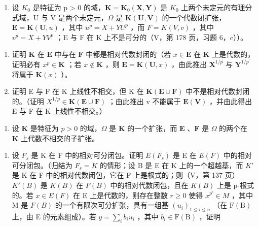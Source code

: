 \BourbakiExerciseGroup

\begin{enumerate}
\def\labelenumi{\arabic{enumi})}
\tightlist
\item
  设 \(K_{0}\) 是特征为 p \textgreater{} 0 的域，\(\mathbf{K} = \mathbf{K}_{0}(\mathbf{X}, \mathbf{Y})\) 是 \(K_{0}\) 上两个未定元的有理分式域，U 与 V 是两个未定元，\(\Omega\) 是 \(\mathbf{K}(\mathbf{U}, \mathbf{V})\) 的一个代数闭扩张，\(\mathbf{E} = \mathbf{K}(\mathbf{U}, u)\) ，其中 \(u^{p} = X + YU^{p}\) ，而 \(F = K(V, v)\) ，其中 \(v^{p} = X + YV^{p}\) ；E 与 F 在 K 上不是可分的（V，第 178 页，习题 6，c））。
\end{enumerate}

\begin{enumerate}
\def\labelenumi{\alph{enumi})}
\item
  证明 \(\mathbf{K}\) 在 \(\mathbf{E}\) 中与在 \(\mathbf{F}\) 中都是相对代数封闭的（若 \(x \in \mathbf{E}\) 在 \(\mathbf{K}\) 上是代数的，证明必有 \(x^p \in \mathbf{K}\) ；若 \(x \notin \mathbf{K}\) ，则 \(\mathbf{E} = \mathbf{K}(\mathbf{U}, x)\) ，由此推出 \(\mathbf{X}^{1/p}\) 与 \(\mathbf{Y}^{1/p}\) 将属于 \(\mathbf{K}(x)\) ）。
\item
  证明 E 与 F 在 K 上线性不相交，但 K 在 \(\mathbf{K}(\mathbf{E} \cup \mathbf{F})\) 中不是相对代数封闭的。（证明 \(X^{1/p} \in \mathbf{K}(\mathbf{E} \cup \mathbf{F})\) ；由此推出 v 不能属于 \(\mathbf{E}(\mathbf{V})\) ，并由此得出 E 与 F 在 K 上线性不相交。）
\end{enumerate}

\begin{enumerate}
\def\labelenumi{\arabic{enumi})}
\setcounter{enumi}{1}
\tightlist
\item
  设 \(\mathbf{K}\) 是特征为 \(p > 0\) 的域，\(\Omega\) 是 \(\mathbf{K}\) 的一个扩张，而 \(\mathbf{E}\) 、\(\mathbf{F}\) 是 \(\Omega\) 的两个在 \(\mathbf{K}\) 上代数不相交的子扩张。
\end{enumerate}

\begin{enumerate}
\def\labelenumi{\alph{enumi})}
\tightlist
\item
  设 \(F_{s}\) 是 K 在 F 中的相对可分闭包。证明 \(E(F_{s})\) 是 E 在 \(E(F)\) 中的相对可分闭包。（归结为 \(F_{s}=K\) 的情形；设 B 是 E 在 K 上的一个超越基，而 \(K'\) 是 K 在 F 中的相对代数闭包，它在 F 上是根式的；则（V，第 137 页）\(K'(B)\) 是 \(K(B)\) 在 \(F(B)\) 中的相对代数闭包，且在 \(K(B)\) 上是 p-根式的。若 \(x\in E(F)\) 在 E 上是代数的，则存在整数 \(r\geqslant0\) 使得 \(x^{p'}\in M\) ，其中 M 是 \(F(B)\) 的一个有限次可分扩张，具有一组基 \((u_{i})_{1\leqslant i\leqslant n}\) （在 \(\mathrm{F(B)}\) 上，由 E 的元素组成）。若 \(y = \sum_{i}b_{i}u_{i}\) ，其中 \(b_{i}\in \mathrm{F(B)}\) ，证明
\end{enumerate}

